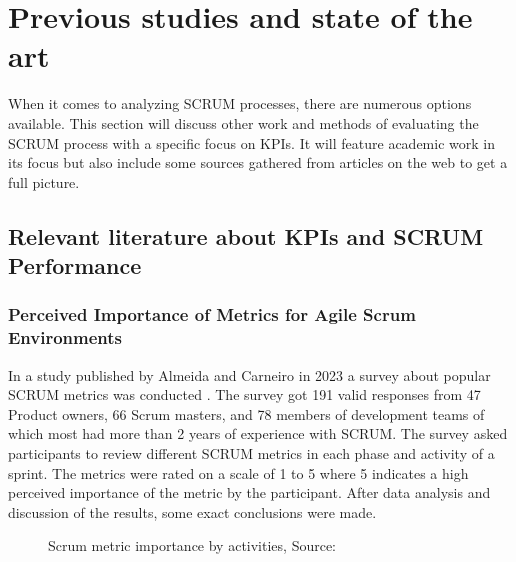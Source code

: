 \newpage

\section{Previous studies and state of the art}\label{SOTAStudies}

When it comes to analyzing SCRUM processes, there are numerous options available. 
This section will discuss other work and methods of evaluating the SCRUM process with a specific focus on KPIs.
It will feature academic work in its focus but also include some sources gathered from articles on the web to get a full picture.

\subsection{Relevant literature about KPIs and SCRUM Performance}

\subsubsection*{Perceived Importance of Metrics for Agile Scrum Environments}

In a study published by Almeida and Carneiro in 2023 a survey about popular SCRUM metrics 
was conducted \parencite{PercPerfOfMetrForAgileScrumEnv}. 
The survey got 191 valid responses from 47 Product owners, 66 Scrum masters, 
and 78 members of development teams of which most had more than 2 years of experience with SCRUM. 
The survey asked participants to review different SCRUM metrics in each phase and activity of a sprint.
The metrics were rated on a scale of 1 to 5 where 5 indicates a high perceived importance 
of the metric by the participant. 
After data analysis and discussion of the results, some exact conclusions were made.


\begin{figure}[!th]
\centering
{}    
\decoRule
\caption[SCRUM metrics]{Scrum metric importance by activities, Source: \cite{PercPerfOfMetrForAgileScrumEnv}}
\label{fig:ScrumMetricsImportance}
\end{figure}


